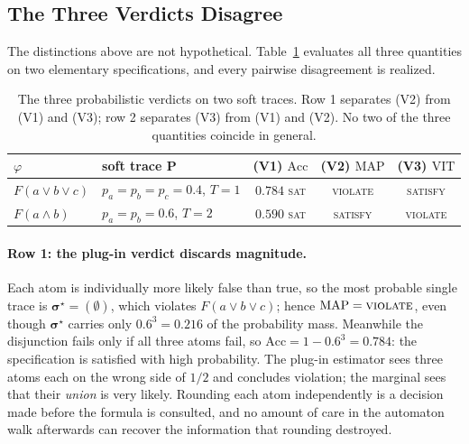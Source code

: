 \subsection{The Three Verdicts Disagree}
\label{sec:prob-disagree}

The distinctions above are not hypothetical. Table~\ref{tab:three-verdicts} evaluates all three quantities on two elementary specifications, and every pairwise disagreement is realized.

\begin{table}[t]
\centering
\begin{tabular}{llccc}
\toprule
$\varphi$ & soft trace $\mathbf{P}$ & (V1) $\mathrm{Acc}$ & (V2) $\mathrm{MAP}$ & (V3) $\mathrm{VIT}$ \\
\midrule
$F(a \lor b \lor c)$ & $p_a = p_b = p_c = 0.4$, $T=1$
  & $0.784$ \;\textsc{sat} & \textsc{violate} & \textsc{satisfy} \\
$F(a \land b)$ & $p_a = p_b = 0.6$, $T=2$
  & $0.590$ \;\textsc{sat} & \textsc{satisfy} & \textsc{violate} \\
\bottomrule
\end{tabular}
\caption{The three probabilistic verdicts on two soft traces. Row 1 separates (V2) from (V1) and (V3); row 2 separates (V3) from (V1) and (V2). No two of the three quantities coincide in general.}
\label{tab:three-verdicts}
\end{table}

\paragraph{Row 1: the plug-in verdict discards magnitude.} Each atom is individually more likely false than true, so the most probable single trace is $\boldsymbol{\sigma}^\star = (\emptyset)$, which violates $F(a \lor b \lor c)$; hence $\mathrm{MAP} = \textsc{violate}$, even though $\boldsymbol{\sigma}^\star$ carries only $0.6^3 = 0.216$ of the probability mass. Meanwhile the disjunction fails only if all three atoms fail, so $\mathrm{Acc} = 1 - 0.6^3 = 0.784$: the specification is satisfied with high probability. The plug-in estimator sees three atoms each on the wrong side of $1/2$ and concludes violation; the marginal sees that their \emph{union} is very likely. Rounding each atom independently is a decision made before the formula is consulted, and no amount of care in the automaton walk afterwards can recover the information that rounding destroyed.

